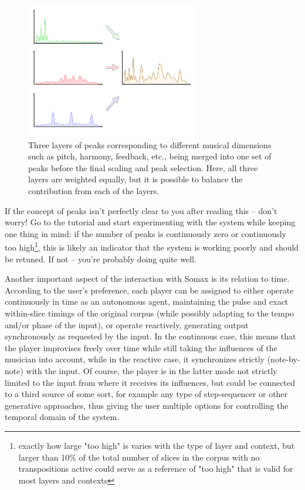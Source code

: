  \begin{figure}[h]
    \centering        
 	\includegraphics[width=0.68\textwidth]{img/peaks_merge.png}
    \caption{Three layers of peaks corresponding to different musical dimensions such as pitch, harmony, feedback, etc., being merged into one set of peaks before the final scaling and peak selection. Here, all three layers are weighted equally, but it is possible to balance the contribution from each of the layers.}
    \label{fig:peakmerge}
\end{figure}

If the concept of peaks isn't perfectly clear to you after reading this – don't worry! Go to the tutorial and start experimenting with the system while keeping one thing in mind: if the number of peaks is continuously zero or continuously too high\footnote{exactly how large "too high" is varies with the type of layer and context, but larger than 10\% of the total number of slices in the corpus with no transpositions active could serve as a reference of "too high" that is valid for most layers and contexts}, this is likely an indicator that the system is working poorly and should be retuned. If not – you're probably doing quite well.

Another important aspect of the interaction with Somax is its relation to time. According to the user's preference, each player can be assigned to either operate continuously in time as an autonomous agent, maintaining the pulse and exact within-slice timings of the original corpus (while possibly adapting to the tempo and/or phase of the input), or operate reactively, generating output synchronously as requested by the input. In the continuous case, this means that the player improvises freely over time while still taking the influences of the musician into account, while in the reactive case, it synchronizes strictly (note-by-note) with the input. Of course, the player is in the latter mode not strictly limited to the input from where it receives its influences, but could be connected to a third source of some sort, for example any type of step-sequencer or other generative approaches, thus giving the user multiple options for controlling the temporal domain of the system.
